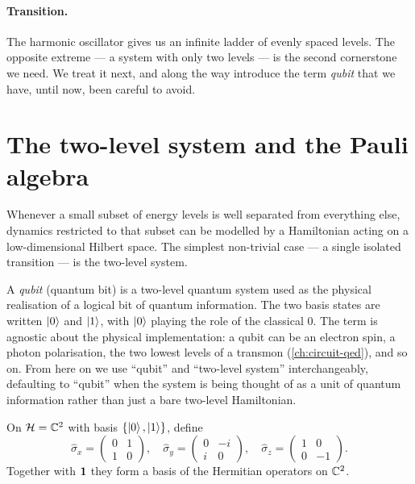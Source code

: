 \paragraph{Transition.}
The harmonic oscillator gives us an infinite ladder of evenly spaced
levels. The opposite extreme --- a system with only two levels ---
is the second cornerstone we need. We treat it next, and along the
way introduce the term \emph{qubit} that we have, until now, been
careful to avoid.

\section{The two-level system and the Pauli algebra}
\label{sec:tls}

\begin{phenomenon}
Whenever a small subset of energy levels is well separated from
everything else, dynamics restricted to that subset can be modelled
by a Hamiltonian acting on a low-dimensional Hilbert space. The
simplest non-trivial case --- a single isolated transition --- is
the two-level system.
\end{phenomenon}

\begin{definition}[Qubit]
\label{def:qubit}
A \emph{qubit} (quantum bit) is a two-level quantum system used as
the physical realisation of a logical bit of quantum information.
The two basis states are written $\ket{0}$ and $\ket{1}$, with
$\ket{0}$ playing the role of the classical $0$. The term is
agnostic about the physical implementation: a qubit can be an
electron spin, a photon polarisation, the two lowest levels of a
transmon (\cref{ch:circuit-qed}), and so on. From here on we use
``qubit'' and ``two-level system'' interchangeably, defaulting to
``qubit'' when the system is being thought of as a unit of quantum
information rather than just a bare two-level Hamiltonian.
\end{definition}

\begin{definition}
\label{def:pauli}
On $\mathcal{H}=\mathbb{C}^2$ with basis $\{\ket{0},\ket{1}\}$, define
\begin{equation}
\hat\sigma_x = \begin{pmatrix}0&1\\1&0\end{pmatrix},\quad
\hat\sigma_y = \begin{pmatrix}0&-i\\i&0\end{pmatrix},\quad
\hat\sigma_z = \begin{pmatrix}1&0\\0&-1\end{pmatrix}.
\end{equation}
Together with $\mathbf{1}$ they form a basis of the Hermitian operators on
$\mathbb{C}^2$.
\end{definition}

